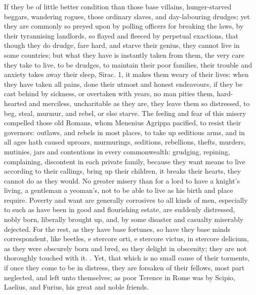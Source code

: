 {{If they be of little better condition than those base villains,
hunger-starved beggars, wandering rogues, those ordinary slaves, and
day-labouring drudges; yet they are commonly so preyed upon by 
polling officers for breaking the laws, by their tyrannising landlords,
so flayed and fleeced by perpetual exactions, that though they do
drudge, fare hard, and starve their genius, they cannot live in
some countries; but what they have is instantly taken from them,
the very care they take to live, to be drudges, to maintain their poor
families, their trouble and anxiety takes away their sleep, Sirac.
 1, it makes them weary of their lives: when they have taken all
pains, done their utmost and honest endeavours, if they be cast behind
by sickness, or overtaken with years, no man pities them, hard-hearted
and merciless, uncharitable as they are, they leave them so distressed,
to beg, steal, murmur, and  rebel, or else starve. The feeling
and fear of this misery compelled those old Romans, whom Menenius
Agrippa pacified, to resist their governors: outlaws, and rebels in
most places, to take up seditious arms, and in all ages hath caused
uproars, murmurings, seditions, rebellions, thefts, murders, mutinies,
jars and contentions in every commonwealth: grudging, repining,
complaining, discontent in each private family, because they want means
to live according to their callings, bring up their children, it breaks
their hearts, they cannot do as they would. No greater misery than for
a lord to have a knight's living, a gentleman a yeoman's, not to be
able to live as his birth and place require. Poverty and want are
generally corrosives to all kinds of men, especially to such as have
been in good and flourishing estate, are suddenly distressed,
nobly born, liberally brought up, and, by some disaster and
casualty miserably dejected. For the rest, as they have base fortunes,
so have they base minds correspondent, like beetles, e stercore orti, e
stercore victus, in stercore delicium, as they were obscurely born and
bred, so they delight in obscenity; they are not thoroughly touched
with it. . Yet, that
which is no small cause of their torments, if once they come to be in
distress, they are forsaken of their fellows, most part neglected, and
left unto themselves; as poor Terence in Rome was by Scipio,
Laelius, and Furius, his great and noble friends.
%
\begin{latin}

\end{latin}}}
